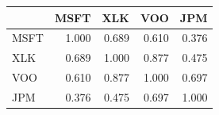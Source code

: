 \begin{tabular}{lrrrr}
\hline
 & MSFT & XLK & VOO & JPM \\
\hline
MSFT & 1.000 & 0.689 & 0.610 & 0.376 \\
XLK & 0.689 & 1.000 & 0.877 & 0.475 \\
VOO & 0.610 & 0.877 & 1.000 & 0.697 \\
JPM & 0.376 & 0.475 & 0.697 & 1.000 \\
\hline
\end{tabular}
